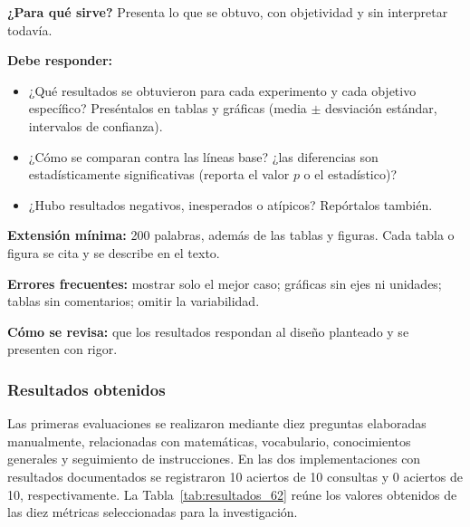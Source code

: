 \begin{guia}
\textbf{¿Para qué sirve?} Presenta lo que se obtuvo, con objetividad y sin interpretar todavía.

\textbf{Debe responder:}
\begin{itemize}[nosep,leftmargin=*]
  \item ¿Qué resultados se obtuvieron para cada experimento y cada objetivo específico? Preséntalos en tablas y gráficas
        (media $\pm$ desviación estándar, intervalos de confianza).
  \item ¿Cómo se comparan contra las líneas base? ¿las diferencias son estadísticamente significativas (reporta el
        valor $p$ o el estadístico)?
  \item ¿Hubo resultados negativos, inesperados o atípicos? Repórtalos también.
\end{itemize}

\textbf{Extensión mínima:} 200 palabras, además de las tablas y figuras. Cada tabla o figura se cita y se describe en
el texto.

\textbf{Errores frecuentes:} mostrar solo el mejor caso; gráficas sin ejes ni unidades; tablas sin comentarios; omitir la
variabilidad.

\textbf{Cómo se revisa:} que los resultados respondan al diseño planteado y se presenten con rigor.
\end{guia}


\subsubsection{Resultados obtenidos}

Las primeras evaluaciones se realizaron mediante diez preguntas elaboradas manualmente, relacionadas con matemáticas, vocabulario, conocimientos generales y seguimiento de instrucciones. En las dos implementaciones con resultados documentados se registraron 10 aciertos de 10 consultas y 0 aciertos de 10, respectivamente. La Tabla~\ref{tab:resultados_62} reúne los valores obtenidos de las diez métricas seleccionadas para la investigación.

